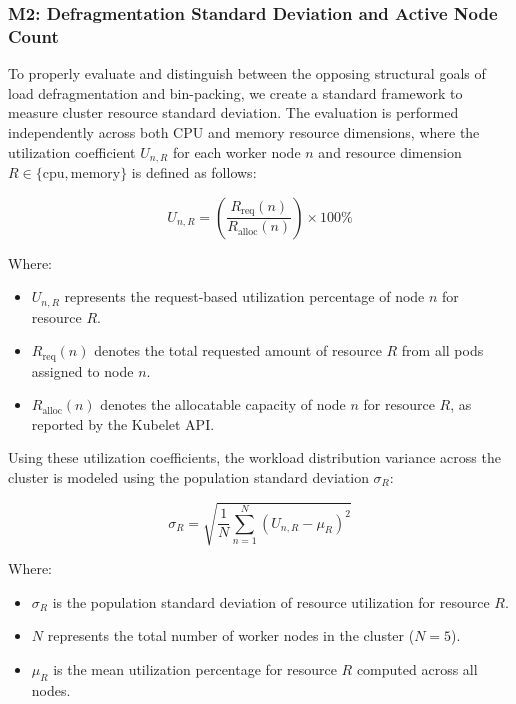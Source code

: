 \subsubsection{M2: Defragmentation Standard Deviation and Active Node Count}
\label{subsubsec:netaware4_evaluationmetrics2}
To properly evaluate and distinguish between the opposing structural goals of load defragmentation and bin-packing, we create a standard framework to measure cluster resource standard deviation. The evaluation is performed independently across both CPU and memory resource dimensions, where the utilization coefficient \(U_{n,R}\) for each worker node \(n\) and resource dimension \(R \in \{\text{cpu}, \text{memory}\}\) is defined as follows:

\[
U_{n,R}
=
\left(
\frac{R_{\text{req}}(n)}
{R_{\text{alloc}}(n)}
\right)
\times 100\%
\]

Where:

\begin{itemize}
    \item \(U_{n,R}\) represents the request-based utilization percentage of node \(n\) for resource \(R\).

    \item \(R_{\text{req}}(n)\) denotes the total requested amount of resource \(R\) from all pods assigned to node \(n\).

    \item \(R_{\text{alloc}}(n)\) denotes the allocatable capacity of node \(n\) for resource \(R\), as reported by the Kubelet API.
\end{itemize}

Using these utilization coefficients, the workload distribution variance across the cluster is modeled using the population standard deviation \(\sigma_R\):

\[
\sigma_R
=
\sqrt{
\frac{1}{N}
\sum_{n=1}^{N}
(U_{n,R} - \mu_R)^2
}
\]

Where:

\begin{itemize}
    \item \(\sigma_R\) is the population standard deviation of resource utilization for resource \(R\).

    \item \(N\) represents the total number of worker nodes in the cluster (\(N=5\)).

    \item \(\mu_R\) is the mean utilization percentage for resource \(R\) computed across all nodes.
\end{itemize}


